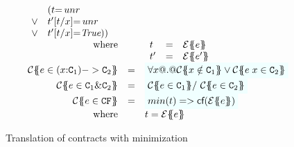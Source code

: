\begin{figure}
\[\begin{array}{c}
\begin{array}{rcl}
\begin{array}[t]{l}
                           \;\;\begin{array}[t]{ll}
                                      & (t{=}\unr\\
                                 \lor & t'[t/x]{=}\unr \\
                                 \lor & t'[t/x]{=}\True))
                                \end{array}
        \end{array} \\
 \mbox{where}  &  &
    \begin{array}[t]{lcl}
      t  & = & \etrans{\Sigma}{\Gamma}{e} \\
      t' & = & \etrans{\Sigma}{\Gamma}{e'}
    \end{array}
\\
\ctrans{\Sigma}{\Gamma}{e \in (x{:}\Ct_1) -> \Ct_2}
  & = & \formula{\forall x @.@ \ctrans{\Sigma}{\Gamma,x}{x \notin \Ct_1}
                          \lor \ctrans{\Sigma}{\Gamma,x}{e\;x \in \Ct_2}}
\\
\ctrans{\Sigma}{\Gamma}{e \in \Ct_1 \& \Ct_2}
   & = & \formula{ \ctrans{\Sigma}{\Gamma}{e \in \Ct_1} /\ \ctrans{\Sigma}{\Gamma}{e \in \Ct_2}}
\\
\ctrans{\Sigma}{\Gamma}{e \in \CF} & = & \formula{min(t) => \lcf{\etrans{\Sigma}{\Gamma}{e}}} \\
\mbox{where}  &  & t = \etrans{\Sigma}{\Gamma}{e}
\end{array}
\end{array}\]
\caption{Translation of contracts with minimization}\label{fig:min-typing}
\end{figure}



